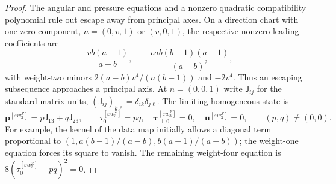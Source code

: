 \documentclass[11pt,a4paper]{article}
\numberwithin{equation}{section}
\theoremstyle{plain}
\theoremstyle{definition}
\theoremstyle{remark}
\begin{document}
\begin{proof}
The angular and pressure equations and a nonzero quadratic
compatibility polynomial rule out escape away from principal axes. On a direction
chart with one zero component, $n=(0,v,1)$ or $(v,0,1)$, the respective nonzero leading
coefficients are
\[
 -\frac{vb(a-1)}{a-b},\qquad
 \frac{vab(b-1)(a-1)}{(a-b)^2},
\]
with weight-two minors $2(a-b)v^4/(a(b-1))$ and $-2v^4$.
Thus an escaping subsequence approaches a principal axis.  At $n=(0,0,1)$
write $\mathsf J_{ij}$ for the standard matrix units,
$(\mathsf J_{ij})_{k\ell}=\delta_{ik}\delta_{j\ell}$.
The limiting homogeneous state is
\begin{equation}\label{iso:escape-plane}
 \boldsymbol p^{[\varepsilon w_3^Z]}=p\mathsf J_{13}+q\mathsf J_{23},\qquad \tau_0^{[\varepsilon w_3^Z]}=pq,\quad \boldsymbol\tau_{\perp0}^{[\varepsilon w_3^Z]}=0,\quad \boldsymbol u^{[\varepsilon w_3^Z]}=0,
 \qquad(p,q)\ne(0,0).
\end{equation}
For example, the kernel of the data map initially allows a diagonal term
proportional to $(1,a(b-1)/(a-b),b(a-1)/(a-b))$; the weight-one equation
forces its square to vanish.  The remaining weight-four equation is
$8(\tau_0^{[\varepsilon w_3^Z]}-pq)^2=0$.


\end{proof}
\end{document}
